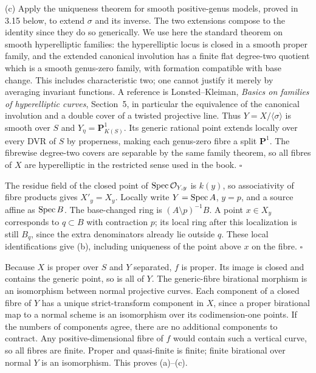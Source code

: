 \documentclass[11pt]{article}
\let\chapterexercise\exercise
\renewcommand{\exercise}[2]{\Needspace{8\baselineskip}\chapterexercise{#1}{#2}}
\begin{document}
(c) Apply the uniqueness theorem for smooth positive-genus models, proved in 3.15 below, to extend $\sigma$ and its inverse. The two extensions compose to the identity since they do so generically. We use here the standard theorem on smooth hyperelliptic families: the hyperelliptic locus is closed in a smooth proper family, and the extended canonical involution has a finite flat degree-two quotient which is a smooth genus-zero family, with formation compatible with base change. This includes characteristic two; one cannot justify it merely by averaging invariant functions. A reference is Lonsted--Kleiman, \emph{Basics on families of hyperelliptic curves}, Section~5, in particular the equivalence of the canonical involution and a double cover of a twisted projective line. Thus $Y=X/\langle\sigma\rangle$ is smooth over $S$ and $Y_\eta=\mathbf P^1_{K(S)}$. Its generic rational point extends locally over every DVR of $S$ by properness, making each genus-zero fibre a split $\mathbf P^1$. The fibrewise degree-two covers are separable by the same family theorem, so all fibres of $X$ are hyperelliptic in the restricted sense used in the book. \hfill$\square$

\pf
The residue field of the closed point of $\operatorname{Spec}\mathcal O_{Y,y}$ is $k(y)$, so associativity of fibre products gives $X'_y=X_y$. Locally write $Y=\operatorname{Spec} A$, $y=p$, and a source affine as $\operatorname{Spec} B$. The base-changed ring is $(A\setminus p)^{-1}B$. A point $x\in X_y$ corresponds to $q\subset B$ with contraction $p$; its local ring after this localization is still $B_q$, since the extra denominators already lie outside $q$. These local identifications give (b), including uniqueness of the point above $x$ on the fibre. \hfill$\square$

\pf
Because $X$ is proper over $S$ and $Y$ separated, $f$ is proper. Its image is closed and contains the generic point, so is all of $Y$. The generic-fibre birational morphism is an isomorphism between normal projective curves. Each component of a closed fibre of $Y$ has a unique strict-transform component in $X$, since a proper birational map to a normal scheme is an isomorphism over its codimension-one points. If the numbers of components agree, there are no additional components to contract. Any positive-dimensional fibre of $f$ would contain such a vertical curve, so all fibres are finite. Proper and quasi-finite is finite; finite birational over normal $Y$ is an isomorphism. This proves (a)--(c).
\end{document}
